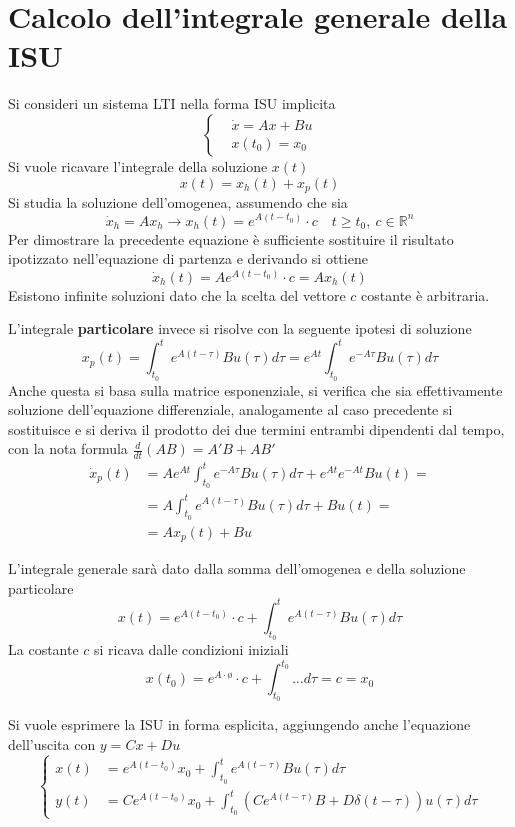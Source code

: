 \newpage
\section{Calcolo dell'integrale generale della ISU}
Si consideri un sistema LTI nella forma ISU implicita
$$\left\{\begin{aligned}
&\dot{x} = Ax + Bu\\
&x(t_0) = x_0
\end{aligned}\right.$$
Si vuole ricavare l'integrale della soluzione $x(t)$
$$
x(t) = x_h(t) + x_p(t)
$$
Si studia la soluzione dell'omogenea, assumendo che sia
$$
\dot x_h = Ax_h \rightarrow x_h(t) = e^{A(t-t_0)}\cdot c \quad t\geq t_0,\
c\in\mathbb{R}^n
$$
Per dimostrare la precedente equazione è sufficiente sostituire il risultato
ipotizzato nell'equazione di partenza e derivando si ottiene
$$
\dot{x}_h(t) = Ae^{A(t-t_0)} \cdot c = Ax_h(t)
$$
Esistono infinite soluzioni dato che la scelta del vettore $c$ costante è
arbitraria.

L'integrale \textbf{particolare} invece si risolve con la seguente ipotesi di
soluzione
$$
x_p(t) = \int_{t_0}^t e^{A(t-\tau)}Bu(\tau)d\tau =
e^{At} \int_{t_0}^t e^{-A\tau}Bu(\tau)d\tau
$$
Anche questa si basa sulla matrice esponenziale, si verifica che sia
effettivamente soluzione dell'equazione differenziale, analogamente al caso
precedente si sostituisce e si deriva il prodotto dei due termini entrambi
dipendenti dal tempo, con la nota formula $\frac{d}{dt}(AB) = A'B + AB'$
$$\begin{aligned}
\dot{x}_p(t) &= Ae^{At} \int_{t_0}^t e^{-A\tau}Bu(\tau)d\tau +
e^{At}e^{-At}Bu(t) =\\
&=A \int_{t_0}^t e^{A(t-\tau)}Bu(\tau)d\tau + Bu(t) = \\
&= Ax_p(t) + Bu
\end{aligned}$$

L'integrale generale sarà dato dalla somma dell'omogenea e della soluzione
particolare
$$
x(t) = e^{A(t-t_0)}\cdot c + \int_{t_0}^t e^{A(t-\tau)}Bu(\tau)d\tau
$$
La costante $c$ si ricava dalle condizioni iniziali
$$
x(t_0) = e^{A\cdot\text{\o{}}}\cdot c + \int_{t_0}^{t_0}\dots d\tau = c = x_0
$$

\newpage
Si vuole esprimere la ISU in forma esplicita, aggiungendo anche l'equazione
dell'uscita con $y=Cx+Du$
$$
\left\{\begin{aligned}
x(t) &= e^{A(t-t_0)} x_0 + \int_{t_0}^{t} e^{A(t-\tau)}Bu(\tau)d\tau\\
y(t) &= Ce^{A(t-t_0)}x_0 + \int_{t_0}^t \left(Ce^{A(t-\tau)}B +
D\delta(t-\tau) \right)u(\tau)d\tau
\end{aligned}\right.
$$

